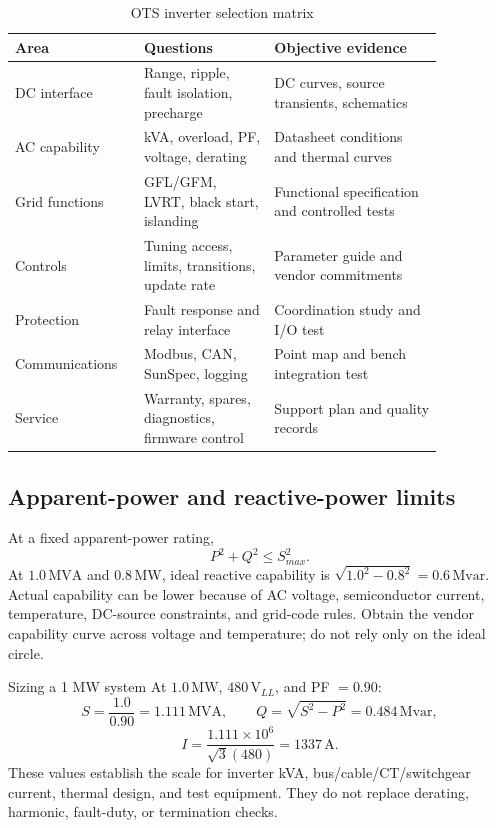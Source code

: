 \documentclass[11pt]{article}
\newcommand{\V}{\mathrm{V}}
\newcommand{\A}{\mathrm{A}}
\newcommand{\MW}{\mathrm{MW}}
\newcommand{\MVA}{\mathrm{MVA}}
\newcommand{\Mvar}{\mathrm{Mvar}}
\begin{document}
\begin{table}[h]
\centering
\caption{OTS inverter selection matrix}
\begin{tabular}{p{0.23\linewidth}p{0.27\linewidth}p{0.35\linewidth}}
\toprule
Area & Questions & Objective evidence \\
\midrule
DC interface & Range, ripple, fault isolation, precharge & DC curves, source transients, schematics \\
AC capability & kVA, overload, PF, voltage, derating & Datasheet conditions and thermal curves \\
Grid functions & GFL/GFM, LVRT, black start, islanding & Functional specification and controlled tests \\
Controls & Tuning access, limits, transitions, update rate & Parameter guide and vendor commitments \\
Protection & Fault response and relay interface & Coordination study and I/O test \\
Communications & Modbus, CAN, SunSpec, logging & Point map and bench integration test \\
Service & Warranty, spares, diagnostics, firmware control & Support plan and quality records \\
\bottomrule
\end{tabular}
\end{table}

\subsection{Apparent-power and reactive-power limits}
At a fixed apparent-power rating,
\[
P^2+Q^2\le S_{max}^2.
\]
At $1.0\,\MVA$ and $0.8\,\MW$, ideal reactive capability is
$\sqrt{1.0^2-0.8^2}=0.6\,\Mvar$. Actual capability can be lower because of AC
voltage, semiconductor current, temperature, DC-source constraints, and
grid-code rules. Obtain the vendor capability curve across voltage and
temperature; do not rely only on the ideal circle.

\begin{examplebox}{Sizing a 1 MW system}
At $1.0\,\MW$, $480\,\V_{LL}$, and PF $=0.90$:
\[
S=\frac{1.0}{0.90}=1.111\,\MVA,\qquad Q=\sqrt{S^2-P^2}=0.484\,\Mvar,
\]
\[
I=\frac{1.111\times10^6}{\sqrt3(480)}=1337\,\A.
\]
These values establish the scale for inverter kVA, bus/cable/CT/switchgear
current, thermal design, and test equipment. They do not replace derating,
harmonic, fault-duty, or termination checks.
\end{examplebox}
\end{document}
